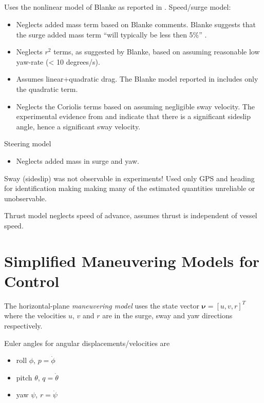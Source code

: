 \documentclass[11pt,draftcls,journal,onecolumn]{IEEEtran}
\begin{document}
\subsection{\cite{caccia08practical}}
Uses the nonlinear model of Blanke \cite{blanke81ship} as reported in \cite{fossen94guidance}.  Speed/surge model:
\begin{itemize}
\item Neglects added mass term based on Blanke comments.  Blanke suggests that the surge added mass term ``will typically be less then 5\%'' \cite{fossen94guidance}.
\item Neglects $r^2$ terms, as suggested by Blanke, based on assuming reasonable low yaw-rate (< 10 degrees/s). 
\item Assumes linear+quadratic drag.  The Blanke model reported in \cite{fossen94guidance} includes only the quadratic term.  
\item Neglects the Coriolis terms based on assuming negligible sway velocity.  The experimental evidence from \cite{sonnenburg13modeling} and \cite{sonnenburg10control} indicate that there is a significant sideslip angle, hence a significant sway velocity.
\end{itemize}
Steering model
\begin{itemize}
\item Neglects added mass in surge and yaw.
\end{itemize}
Sway (sideslip) was not observable in experiments!  Used only GPS and heading for identification making making many of the estimated quantities unreliable or unobservable.

Thrust model neglects speed of advance, assumes thrust is independent of vessel speed.

\section{Simplified Maneuvering Models for Control}
The horizontal-plane \emph{maneuvering model} uses the state vector $\bm{\nu}=[u,v,r]^T$ where the velocities $u$, $v$ and $r$ are in the surge, sway and yaw directions respectively. 

Euler angles for angular displacements/velocities are
\begin{itemize}
\item roll $\phi$, $p=\dot{\phi}$
\item pitch $\theta$, $q=\dot{\theta}$
\item yaw $\psi$, $r=\dot{\psi}$
\end{itemize}
\end{document}
